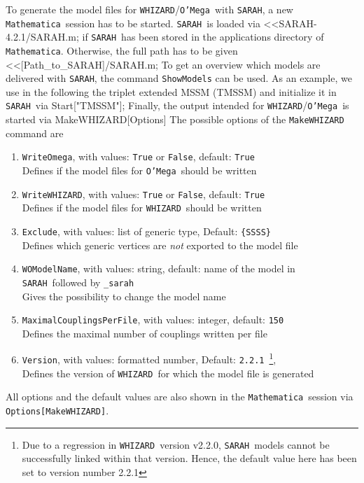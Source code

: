 \documentclass[12pt]{book}
\newenvironment{code}%
  {\begingroup\footnotesize
   \quote
   \Verbatim}%
  {\endVerbatim
   \endquote
   \endgroup\noindent}
\newcommand{\ttt}[1]{\texttt{#1}}
\newcommand{\whizard}{\ttt{WHIZARD}}
\newcommand{\oMega}{\ttt{O'Mega}}
\newcommand{\sarah}{\ttt{SARAH}}
\newcommand{\Mathematica}{\ttt{Mathematica}}
\begin{document}
To generate the model files for \whizard/\oMega\ with \sarah, a
new \Mathematica\ session has to be started. \sarah\ is loaded via
\begin{code}
<<SARAH-4.2.1/SARAH.m;
\end{code}
if \sarah\ has been stored in the applications directory of
\Mathematica. Otherwise, the full path has to be given
\begin{code}
<<[Path_to_SARAH]/SARAH.m;
\end{code}
To get an overview which models are delivered with \sarah, the command \verb"ShowModels"
can be used. As an example, we use in the following the triplet
extended MSSM (TMSSM) and initialize it in \sarah\ via
\begin{code}
Start["TMSSM"];
\end{code}
Finally, the output intended for \whizard/\oMega\ is started via
\begin{code}
MakeWHIZARD[Options]
\end{code}
The possible options of the \verb"MakeWHIZARD" command are
\begin{enumerate}
  \item \verb"WriteOmega", with values: \verb"True" or \verb"False", default:
    \verb"True" \\
    Defines if the model files for \oMega\ should be written
  \item \verb"WriteWHIZARD", with values: \verb"True" or \verb"False",
    default: \verb"True" \\
    Defines if the model files for \whizard\ should be written
  \item \verb"Exclude", with values: list of generic type, Default:
    \verb"{SSSS}" \\
    Defines which generic vertices are {\em not} exported to the model
    file
  \item \verb"WOModelName", with values: string, default: name of the
    model in \sarah\ followed by \verb"_sarah"  \\
    Gives the possibility to change the model name
  \item \verb"MaximalCouplingsPerFile", with values: integer, default:
    \ttt{150} \\
    Defines the maximal number of couplings written per file
  \item \verb"Version", with values: formatted number, Default:
    \verb"2.2.1"~\footnote{Due to a regression in \whizard\ version
      v2.2.0, \sarah\ models cannot be successfully linked within
      that version. Hence, the default value here has been set to
      version number 2.2.1}, \\
    Defines the version of \whizard\ for which the model file is generated
\end{enumerate}
All options and the default values are also shown in the
\Mathematica\ session via \newline\verb"Options[MakeWHIZARD]".
\end{document}
